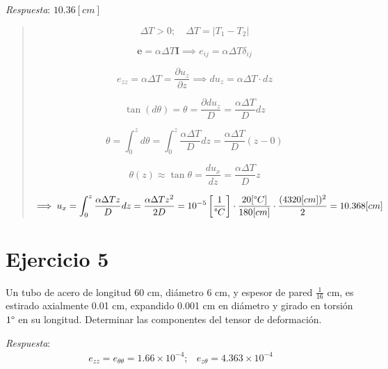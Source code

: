 \documentclass[a4paper,10pt,twoside,final,spanish]{article}
\begin{document}
\textit{Respuesta}: $10.36[cm]$ 

\dotfill

\begin{quote}
\[
\Delta T>0;\quad \Delta T=|T_{1}-T_{2}|
\]

\[
\mathbf{e}=\alpha\Delta T\mathbf{I} \implies e_{ij}=\alpha\Delta T\delta_{ij}
\]

\[
e_{zz}=\alpha\Delta T=\frac{\partial u_{z}}{\partial z} \implies
du_{z}=\alpha\Delta T\cdot dz
\]

\[
\tan(d\theta)=\theta=\frac{\partial du_{z}}{D}=\frac{\alpha\Delta T}{D}dz
\]

\[
\theta=\int_{0}^{z}d\theta=\int_{0}^{z}\frac{\alpha\Delta T}{D}dz
=\frac{\alpha\Delta T}{D}(z-0)
\]

\[
\theta(z)\approx\tan\theta=\frac{du_{x}}{dz}=\frac{\alpha\Delta T}{D}z
\]

\[
\implies
u_{x}=\int_{0}^{z}\frac{\alpha\Delta T z}{D}dz=\frac{\alpha\Delta T z^{2}}{2D}
=
10^{-5}\left[\frac{1}{\degree C}\right]\cdot
\frac{20[\degree C]}{180[cm]}\cdot
\frac{(4320[cm])^{2}}{2}
=10.368[cm]
\]

\end{quote}

\section*{Ejercicio 5}

Un tubo de acero de longitud 60 cm, diámetro 6 cm, y espesor de pared $\frac{1}{16}$ cm, es estirado axialmente 0.01 cm, expandido 0.001 cm en diámetro y girado en torsión $1\degree$ en su longitud. Determinar las componentes del tensor de deformación.

\textit{Respuesta}:
\[
\begin{array}{cc}
e_{zz}=e_{\theta\theta}=1.66\times 10^{-4}; &
e_{z\theta}= 4.363\times 10^{-4}
\end{array}
\]

\dotfill
\end{document}
